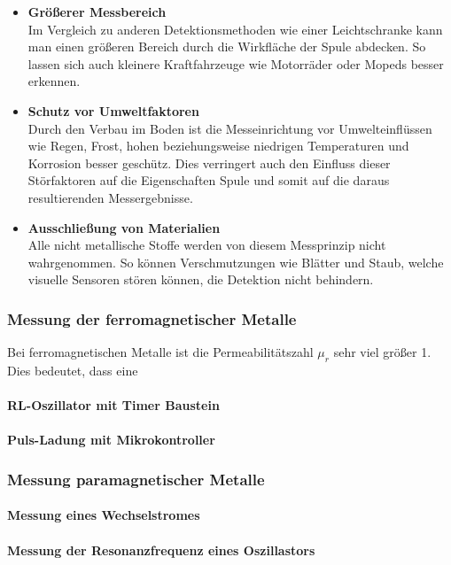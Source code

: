 \begin{itemize}
    \item \textbf{Größerer Messbereich} \\
    Im Vergleich zu anderen Detektionsmethoden wie einer Leichtschranke kann man einen größeren Bereich durch die Wirkfläche
    der Spule abdecken. So lassen sich auch kleinere Kraftfahrzeuge wie Motorräder oder Mopeds besser erkennen.
    \item \textbf{Schutz vor Umweltfaktoren} \\
    Durch den Verbau im Boden ist die Messeinrichtung vor Umwelteinflüssen wie Regen, Frost, hohen beziehungsweise
    niedrigen Temperaturen und Korrosion besser geschütz. Dies verringert auch den Einfluss dieser Störfaktoren auf die Eigenschaften
    Spule und somit auf die daraus resultierenden Messergebnisse.
    \item \textbf{Ausschließung von Materialien} \\
    Alle nicht metallische Stoffe werden von diesem Messprinzip nicht wahrgenommen. So können Verschmutzungen wie Blätter und Staub, welche
    visuelle Sensoren stören können, die Detektion nicht behindern.
    
\end{itemize}
\subsubsection{Messung der ferromagnetischer Metalle}
Bei ferromagnetischen Metalle ist die Permeabilitätszahl  $\mu_{r}$ sehr viel größer 1. Dies bedeutet, dass eine 
\paragraph{RL-Oszillator mit Timer Baustein}
\paragraph{Puls-Ladung mit Mikrokontroller}
\subsubsection{Messung paramagnetischer Metalle}
\paragraph{Messung eines Wechselstromes}
\paragraph{Messung der Resonanzfrequenz eines Oszillastors}

